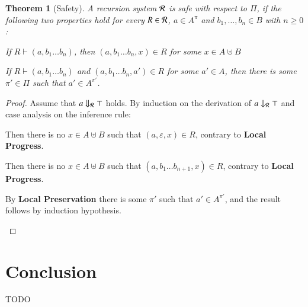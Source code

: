 \documentclass[a4paper,final,preprint,sort&compress]{elsarticle}
\newtheorem{theorem}[definition]{Theorem}
\begin{document}

\begin{theorem}[Safety]
  A recursion system $\mathcal{R}$ is safe with respect to $\Pi$, if the following two properties 
  hold for every $R \in \mathcal{R}$, $a \in A^\pi$ and $b_1,\ldots,b_n \in B$ with $n \ge 0$:
  \begin{description}[labelindent=\parindent,style=nextline]
  \item[Local Progress]

    If \mbox{$R \vdash (a,b_1 \ldots b_n)$}, then \mbox{$(a,b_1 \ldots b_n,x) \in R$} for
    some \mbox{$x \in A \uplus B$}

  \item[Local Preservation]

    If \mbox{$R \vdash (a,b_1 \ldots b_n)$} and \mbox{$(a,b_1 \ldots b_n,a') \in R$} for
    some $a' \in A$, then there is some $\pi' \in \Pi$ such that $a' \in A^{\pi'}$.
  \end{description}
\end{theorem}

\begin{proof}
  Assume that $a \Downarrow_{\mathcal{R}} \top$ holds. By induction on the derivation of $a \Downarrow_{\mathcal{R}} \top$ and
  case analysis on the inference rule:
  \begin{description}[font=\sc,labelindent=\parindent,style=nextline]
  \item[(Err-1)]

    Then there is no \mbox{$x \in A \uplus B$} such that \mbox{$(a,\varepsilon,x) \in R$},
    contrary to \textbf{Local Progress}.

  \item[(Err-2)]

    Then there is no \mbox{$x \in A \uplus B$} such that \mbox{$(a,b_1 \ldots b_{n+1},x) \in R$},
    contrary to \textbf{Local Progress}.

  \item[(Err-3)]

    By \textbf{Local Preservation} there is some $\pi'$ such that $a' \in A^{\pi'}$, and the result
    follows by induction hypothesis.
    
  \end{description}
\end{proof}


\section{Conclusion}
\label{sec:Conclusion}


TODO




\end{document}
